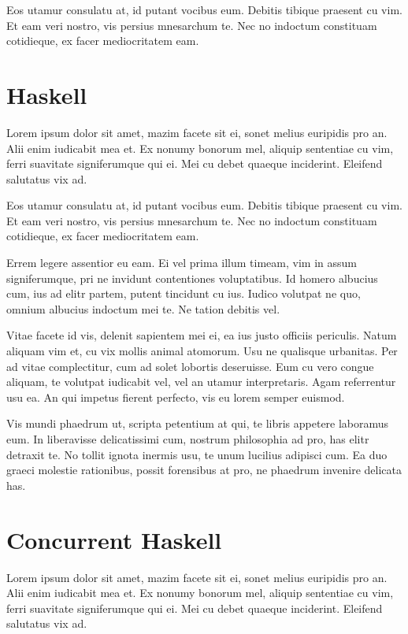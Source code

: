 \documentclass[a4paper,11pt,oneside]{report}
\begin{document}
Eos utamur consulatu at, id putant vocibus eum. Debitis tibique praesent cu
vim. Et eam veri nostro, vis persius mnesarchum te. Nec no indoctum constituam
cotidieque, ex facer mediocritatem eam.


\section{Haskell}

Lorem ipsum dolor sit amet, mazim facete sit ei, sonet melius euripidis pro
an. Alii enim iudicabit mea et. Ex nonumy bonorum mel, aliquip sententiae cu
vim, ferri suavitate signiferumque qui ei. Mei cu debet quaeque
inciderint. Eleifend salutatus vix ad.

Eos utamur consulatu at, id putant vocibus eum. Debitis tibique praesent cu
vim. Et eam veri nostro, vis persius mnesarchum te. Nec no indoctum constituam
cotidieque, ex facer mediocritatem eam.

Errem legere assentior eu eam. Ei vel prima illum timeam, vim in assum
signiferumque, pri ne invidunt contentiones voluptatibus. Id homero albucius
cum, ius ad elitr partem, putent tincidunt cu ius. Iudico volutpat ne quo,
omnium albucius indoctum mei te. Ne tation debitis vel.

Vitae facete id vis, delenit sapientem mei ei, ea ius justo officiis
periculis. Natum aliquam vim et, cu vix mollis animal atomorum. Usu ne qualisque
urbanitas. Per ad vitae complectitur, cum ad solet lobortis deseruisse. Eum cu
vero congue aliquam, te volutpat iudicabit vel, vel an utamur
interpretaris. Agam referrentur usu ea. An qui impetus fierent perfecto, vis eu
lorem semper euismod.

Vis mundi phaedrum ut, scripta petentium at qui, te libris appetere laboramus
eum. In liberavisse delicatissimi cum, nostrum philosophia ad pro, has elitr
detraxit te. No tollit ignota inermis usu, te unum lucilius adipisci cum. Ea duo
graeci molestie rationibus, possit forensibus at pro, ne phaedrum invenire
delicata has.

\section{Concurrent Haskell}

Lorem ipsum dolor sit amet, mazim facete sit ei, sonet melius euripidis pro
an. Alii enim iudicabit mea et. Ex nonumy bonorum mel, aliquip sententiae cu
vim, ferri suavitate signiferumque qui ei. Mei cu debet quaeque
inciderint. Eleifend salutatus vix ad.
\end{document}
